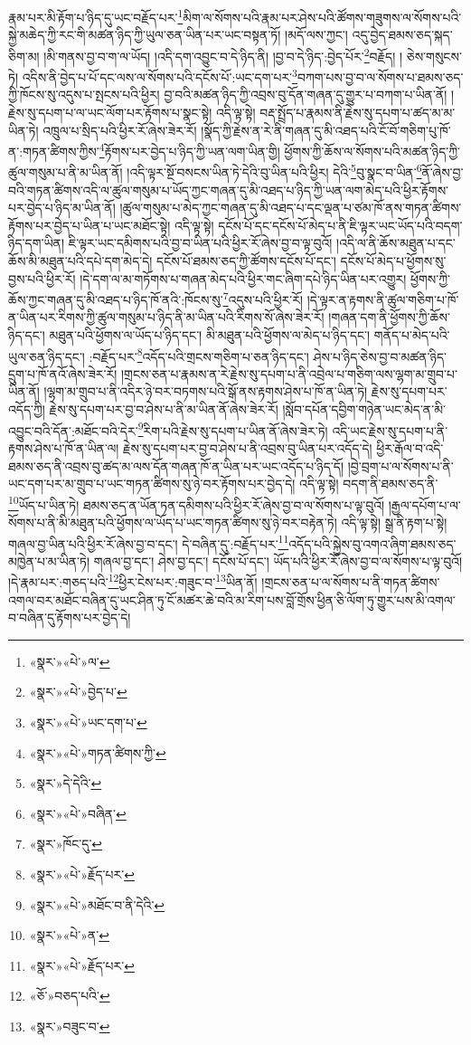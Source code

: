 རྣམ་པར་མི་རྟོག་པ་ཉིད་དུ་ཡང་བརྗོད་པར་\footnote{«སྣར་»«པེ་»ལ་}མིག་ལ་སོགས་པའི་རྣམ་པར་ཤེས་པའི་ཚོགས་གཟུགས་ལ་སོགས་པའི་སྐྱེ་མཆེད་ཀྱི་རང་གི་མཚན་ཉིད་ཀྱི་ཡུལ་ཅན་ཡིན་པར་ཡང་བསྟན་ཏོ། །མདོ་ལས་ཀྱང་། འདུ་བྱེད་ཐམས་ཅད་སྐད་ཅིག་མ། །མི་གནས་བྱ་བ་ག་ལ་ཡོད། །འདི་དག་འབྱུང་བ་དེ་ཉིད་ནི། །བྱ་བ་དེ་ཉིད་:བྱེད་པོར་\footnote{«སྣར་»«པེ་»བྱེད་པ་}བརྗོད། །
ཅེས་གསུངས་ཏེ། འདིས་ནི་བྱེད་པ་པོ་དང་ལས་ལ་སོགས་པའི་དངོས་པོ་:ཡང་དག་པར་\footnote{«སྣར་»«པེ་»ཡང་དག་པ་}བཀག་པས་བྱ་བ་ལ་སོགས་པ་ཐམས་ཅད་ཀྱི་ཁོངས་སུ་འདུས་པ་སྤངས་པའི་ཕྱིར། བྱ་བའི་མཚན་ཉིད་ཀྱི་འབྲས་བུ་དོན་གཞན་དུ་གྱུར་པ་བཀག་པ་ཡིན་ནོ། །རྗེས་སུ་དཔག་པ་ལ་ཡང་ལོག་པར་རྟོགས་པ་སྣང་སྟེ། འདི་ལྟ་སྟེ། བརྡ་སྤྲོད་པ་རྣམས་ནི་རྗེས་སུ་དཔག་པ་ཚད་མ་མ་ཡིན་ཏེ། འཁྲུལ་པ་སྲིད་པའི་ཕྱིར་རོ་ཞེས་ཟེར་རོ། །སྣོད་ཀྱི་རྗེས་ན་རེ་ནི་གཞན་དུ་མི་འཐད་པའི་ངོ་བོ་གཅིག་པུ་ཁོ་ན་:གཏན་ཚིགས་ཀྱིས་\footnote{«སྣར་»«པེ་»གཏན་ཚིགས་ཀྱི་}རྟོགས་པར་བྱེད་པ་ཉིད་ཀྱི་ཡན་ལག་ཡིན་གྱི། ཕྱོགས་ཀྱི་ཆོས་ལ་སོགས་པའི་མཚན་ཉིད་ཀྱི་ཚུལ་གསུམ་པ་ནི་མ་ཡིན་ནོ། །འདི་ལྟར་སྔོ་བསངས་ཡིན་ཏེ་དེའི་བུ་ཡིན་པའི་ཕྱིར། དེའི་\footnote{«སྣར་»དེ་དེའི་}བུ་སྣང་བ་ཡིན་\footnote{«སྣར་»«པེ་»བཞིན་}ནོ་ཞེས་བྱ་བའི་གཏན་ཚིགས་འདི་ལ་ཚུལ་གསུམ་པ་ཡོད་ཀྱང་གཞན་དུ་མི་འཐད་པ་ཉིད་ཀྱི་ཡན་ལག་མེད་པའི་ཕྱིར་རྟོགས་པར་བྱེད་པ་ཉིད་མ་ཡིན་ནོ། །ཚུལ་གསུམ་པ་མེད་ཀྱང་གཞན་དུ་མི་འཐད་པ་དང་ལྡན་པ་ཙམ་ཁོ་ནས་གཏན་ཚིགས་རྟོགས་པར་བྱེད་པ་ཡིན་པ་ཡང་མཐོང་སྟེ། འདི་ལྟ་སྟེ། དངོས་པོ་དང་དངོས་པོ་མེད་པ་ནི་ཇི་ལྟར་ཡང་ཡོད་པའི་བདག་ཉིད་དག་ཡིན། ཇི་ལྟར་ཡང་དམིགས་པའི་བྱ་བ་ཡིན་པའི་ཕྱིར་རོ་ཞེས་བྱ་བ་ལྟ་བུའོ། །འདི་ལ་ནི་ཆོས་མཐུན་པ་དང་ཆོས་མི་མཐུན་པའི་དཔེ་དག་མེད་དེ། དངོས་པོ་ཐམས་ཅད་ཀྱི་ཚོགས་དངོས་པོ་དང་། དངོས་པོ་མེད་པ་ཕྱོགས་སུ་བྱས་པའི་ཕྱིར་རོ། །དེ་དག་ལ་མ་གཏོགས་པ་གཞན་མེད་པའི་ཕྱིར་གང་ཞིག་དཔེ་ཉིད་ཡིན་པར་འགྱུར། ཕྱོགས་ཀྱི་ཆོས་ཀྱང་གཞན་དུ་མི་འཐད་པ་ཉིད་ཁོ་ནའི་:ཁོངས་སུ་\footnote{«སྣར་»ཁོང་དུ་}འདུས་པའི་ཕྱིར་རོ། །དེ་ལྟར་ན་རྟགས་ནི་ཚུལ་གཅིག་པ་ཁོ་ན་ཡིན་པར་རིགས་ཀྱི་ཚུལ་གསུམ་པ་ཉིད་ནི་མ་ཡིན་པའི་རིགས་སོ་ཞེས་ཟེར་རོ། །གཞན་དག་ནི་ཕྱོགས་ཀྱི་ཆོས་ཉིད་དང་། མཐུན་པའི་ཕྱོགས་ལ་ཡོད་པ་ཉིད་དང་། མི་མཐུན་པའི་ཕྱོགས་ལ་མེད་པ་ཉིད་དང་། གནོད་པ་མེད་པའི་ཡུལ་ཅན་ཉིད་དང་། :བརྗོད་པར་\footnote{«སྣར་»«པེ་»རྗོད་པར་}འདོད་པའི་གྲངས་གཅིག་པ་ཅན་ཉིད་དང་། ཤེས་པ་ཉིད་ཅེས་བྱ་བ་མཚན་ཉིད་དྲུག་པ་ཁོ་ནའོ་ཞེས་ཟེར་རོ། །གྲངས་ཅན་པ་རྣམས་ན་རེ་རྗེས་སུ་དཔག་པ་ནི་འབྲེལ་པ་གཅིག་ལས་ལྷག་མ་གྲུབ་པ་ཡིན་ནོ། །ལྷག་མ་གྲུབ་པ་ནི་འདིར་ཉེ་བར་བཏགས་པའི་སྒོ་ནས་རྟགས་ཤེས་པ་ཁོ་ན་ཡིན་ཏེ། རྗེས་སུ་དཔག་པར་འདོད་ཀྱི། རྗེས་སུ་དཔག་པར་བྱ་བ་ཤེས་པ་ནི་མ་ཡིན་ནོ་ཞེས་ཟེར་རོ། །སློབ་དཔོན་དབྱིག་གཉེན་ཡང་མེད་ན་མི་འབྱུང་བའི་དོན་:མཐོང་བའི་དེར་\footnote{«སྣར་»«པེ་»མཐོང་བ་ནི་དེའི་}རིག་པའི་རྗེས་སུ་དཔག་པ་ཡིན་ནོ་ཞེས་ཟེར་ཏེ། འདི་ཡང་རྗེས་སུ་དཔག་པ་ནི་རྟགས་ཤེས་པ་ཁོ་ན་ཡིན་ལ། རྗེས་སུ་དཔག་པར་བྱ་བ་ཤེས་པ་ནི་འབྲས་བུ་ཡིན་པར་འདོད་དེ། ཕྱིར་རྒོལ་བ་འདི་ཐམས་ཅད་ནི་འབྲས་བུ་ཚད་མ་ལས་དོན་གཞན་ཁོ་ན་ཡིན་པར་ཡང་འདོད་པ་ཉིད་དོ། །བྱེ་བྲག་པ་ལ་སོགས་པ་ནི་ཡང་དག་པར་མ་གྲུབ་པ་ཡང་གཏན་ཚིགས་སུ་ཉེ་བར་རྟོགས་པར་བྱེད་དེ། འདི་ལྟ་སྟེ། བདག་ནི་ཐམས་ཅད་ནི་\footnote{«སྣར་»«པེ་»ན་}ཡོད་པ་ཡིན་ཏེ། ཐམས་ཅད་ན་ཡོན་ཏན་དམིགས་པའི་ཕྱིར་རོ་ཞེས་བྱ་བ་ལ་སོགས་པ་ལྟ་བུའོ། །རྒྱལ་དཔོག་པ་ལ་སོགས་པ་ནི་མི་མཐུན་པའི་ཕྱོགས་ལ་ཡོད་པ་ཡང་གཏན་ཚིགས་སུ་ཉེ་བར་བརྟེན་ཏེ། འདི་ལྟ་སྟེ། སྒྲ་ནི་རྟག་པ་སྟེ། གཞལ་བྱ་ཡིན་པའི་ཕྱིར་རོ་ཞེས་བྱ་བ་དང་། དེ་བཞིན་དུ་:བརྗོད་པར་\footnote{«སྣར་»«པེ་»རྗོད་པར་}འདོད་པའི་སྐྱེས་བུ་འགའ་ཞིག་ཐམས་ཅད་མཁྱེན་པ་མ་ཡིན་ཏེ། གཞལ་བྱ་དང་། ཤེས་བྱ་དང་། དངོས་པོ་དང་། ཡོད་པའི་ཕྱིར་རོ་ཞེས་བྱ་བ་ལ་སོགས་པ་ལྟ་བུའོ། །དེ་རྣམ་པར་:གཅད་པའི་\footnote{«ཅོ་»བཅད་པའི་}ཕྱིར་ངེས་པར་:གཟུང་བ་\footnote{«སྣར་»བཟུང་བ་}ཡིན་ནོ། །གྲངས་ཅན་པ་ལ་སོགས་པ་ནི་གཏན་ཚིགས་འགལ་བར་མཐོང་བཞིན་དུ་ཡང་ཤིན་ཏུ་ངོ་མཚར་ཆེ་བའི་མ་རིག་པས་བློ་གྲོས་ཕྱིན་ཅི་ལོག་ཏུ་གྱུར་པས་མི་འགལ་བ་བཞིན་དུ་རྟོགས་པར་བྱེད་དེ། 